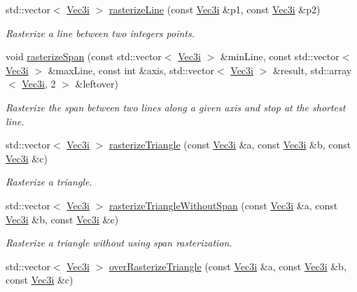 \begin{DoxyCompactItemize}
\item 
std\+::vector$<$ \hyperlink{classhokusai_1_1Vec3}{Vec3i} $>$ \hyperlink{namespacehokusai_a821eba95709f9464fc1462ebf4c42ded}{rasterize\+Line} (const \hyperlink{classhokusai_1_1Vec3}{Vec3i} \&p1, const \hyperlink{classhokusai_1_1Vec3}{Vec3i} \&p2)
\begin{DoxyCompactList}\small\item\em Rasterize a line between two integers points. \end{DoxyCompactList}\item 
void \hyperlink{namespacehokusai_ad24dc764ed9233585e01e2b013a70245}{rasterize\+Span} (const std\+::vector$<$ \hyperlink{classhokusai_1_1Vec3}{Vec3i} $>$ \&min\+Line, const std\+::vector$<$ \hyperlink{classhokusai_1_1Vec3}{Vec3i} $>$ \&max\+Line, const int \&axis, std\+::vector$<$ \hyperlink{classhokusai_1_1Vec3}{Vec3i} $>$ \&result, std\+::array$<$ \hyperlink{classhokusai_1_1Vec3}{Vec3i}, 2 $>$ \&leftover)
\begin{DoxyCompactList}\small\item\em Rasterize the span between two lines along a given axis and stop at the shortest line. \end{DoxyCompactList}\item 
std\+::vector$<$ \hyperlink{classhokusai_1_1Vec3}{Vec3i} $>$ \hyperlink{namespacehokusai_ac05db91fd794596ea09049dbcb65c5fd}{rasterize\+Triangle} (const \hyperlink{classhokusai_1_1Vec3}{Vec3i} \&a, const \hyperlink{classhokusai_1_1Vec3}{Vec3i} \&b, const \hyperlink{classhokusai_1_1Vec3}{Vec3i} \&c)
\begin{DoxyCompactList}\small\item\em Rasterize a triangle. \end{DoxyCompactList}\item 
std\+::vector$<$ \hyperlink{classhokusai_1_1Vec3}{Vec3i} $>$ \hyperlink{namespacehokusai_ab93e9a89663991d8f478b1a3961f14de}{rasterize\+Triangle\+Without\+Span} (const \hyperlink{classhokusai_1_1Vec3}{Vec3i} \&a, const \hyperlink{classhokusai_1_1Vec3}{Vec3i} \&b, const \hyperlink{classhokusai_1_1Vec3}{Vec3i} \&c)
\begin{DoxyCompactList}\small\item\em Rasterize a triangle without using span rasterization. \end{DoxyCompactList}\item 
std\+::vector$<$ \hyperlink{classhokusai_1_1Vec3}{Vec3i} $>$ \hyperlink{namespacehokusai_ac473f7a7ae5d1792a42b8a65eded70e2}{over\+Rasterize\+Triangle} (const \hyperlink{classhokusai_1_1Vec3}{Vec3i} \&a, const \hyperlink{classhokusai_1_1Vec3}{Vec3i} \&b, const \hyperlink{classhokusai_1_1Vec3}{Vec3i} \&c)

\end{DoxyCompactItemize}
